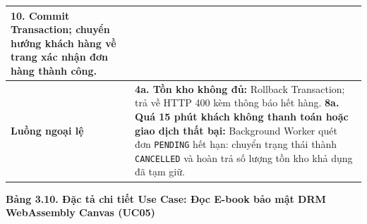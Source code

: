 \documentclass[11pt, a4paper]{report}
\begin{document}
\begin{longtable}{p{3.8cm} p{10.5cm}}
10. Commit Transaction; chuyển hướng khách hàng về trang xác nhận đơn hàng thành công. \\
\midrule
\textbf{Luồng ngoại lệ} & 
\textbf{4a. Tồn kho không đủ:} Rollback Transaction; trả về HTTP 400 kèm thông báo hết hàng.\newline
\textbf{8a. Quá 15 phút khách không thanh toán hoặc giao dịch thất bại:} Background Worker quét đơn \texttt{PENDING} hết hạn: chuyển trạng thái thành \texttt{CANCELLED} và hoàn trả số lượng tồn kho khả dụng đã tạm giữ. \\
\bottomrule
\end{longtable}

\vspace{0.3cm}
\noindent\textbf{Bảng 3.10. Đặc tả chi tiết Use Case: Đọc E-book bảo mật DRM WebAssembly Canvas (UC05)}
\end{document}
